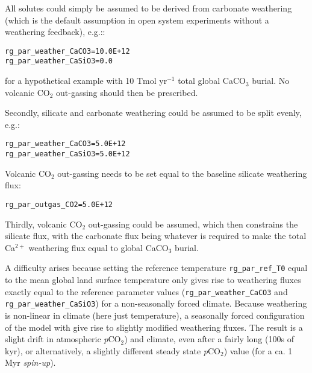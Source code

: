 \documentclass[10pt,twoside]{article}
\begin{document}
\begin{compactenum}
        
\item All solutes could simply be assumed to be derived from carbonate weathering (which is the default assumption in open system experiments without a weathering feedback), e.g.::
\vspace{-5pt}\begin{verbatim}
rg_par_weather_CaCO3=10.0E+12
rg_par_weather_CaSiO3=0.0
\end{verbatim}\vspace{-5pt}
for a hypothetical example with 10 Tmol yr$^{-1}$ total global CaCO$_{3}$ burial. No volcanic CO$_{2}$ out-gassing should then be prescribed.
\item Secondly, silicate and carbonate weathering could be assumed to be split evenly, e.g.:
\vspace{-5pt}\begin{verbatim}
rg_par_weather_CaCO3=5.0E+12
rg_par_weather_CaSiO3=5.0E+12
\end{verbatim}\vspace{-5pt}
Volcanic CO$_{2}$ out-gassing needs to be set equal to the baseline silicate weathering flux:
\vspace{-5pt}\begin{verbatim}
rg_par_outgas_CO2=5.0E+12
\end{verbatim}\vspace{-5pt}
\item Thirdly, volcanic CO$_{2}$ out-gassing could be assumed, which then constrains the silicate flux, with the carbonate flux being whatever is required to make the total Ca$^{2+}$ weathering flux equal to global CaCO$_{3}$ burial.

\end{compactenum}

A difficulty arises because setting the reference temperature \texttt{rg\_par\_ref\_T0} equal to the mean global land surface temperature only gives rise to weathering fluxes exactly equal to the reference parameter values (\texttt{rg\_par\_weather\_CaCO3} and \texttt{rg\_par\_weather\_CaSiO3}) for a non-seasonally forced climate. Because weathering is non-linear in climate (here just temperature), a seasonally forced configuration of the model with give rise to slightly modified weathering fluxes. The result is a slight drift in atmospheric \textit{p}CO${_2}$) and climate, even after a fairly long (100s of kyr), or alternatively, a slightly different steady state \textit{p}CO${_2}$) value (for a ca. 1 Myr \textit{spin-up}).
\end{document}
